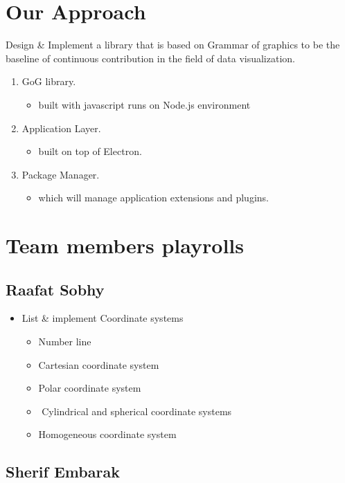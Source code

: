 \documentclass[12pt]{article}
\begin{document}
\section{Our Approach}
Design \& Implement a library that is based on Grammar of graphics to be the baseline of continuous contribution in the field of data visualization. \\
\begin{enumerate}
\item GoG library.
\begin{itemize}
\item built with javascript runs on Node.js environment
\end{itemize}
\item Application Layer.
\begin{itemize}
\item built on top of Electron.
\end{itemize}
\item Package Manager.
\begin{itemize}
\item which will manage application extensions and plugins.
\end{itemize}
\end{enumerate}

\section{Team members playrolls}
\subsection{Raafat Sobhy}
\begin{itemize}
\item List \& implement Coordinate systems
\begin{itemize}
\item Number line
­\item Cartesian coordinate system
\item Polar coordinate system
\item ­ Cylindrical and spherical coordinate systems
\item Homogeneous coordinate system
\end{itemize}
\end{itemize}
\subsection{Sherif Embarak}
\end{document}
